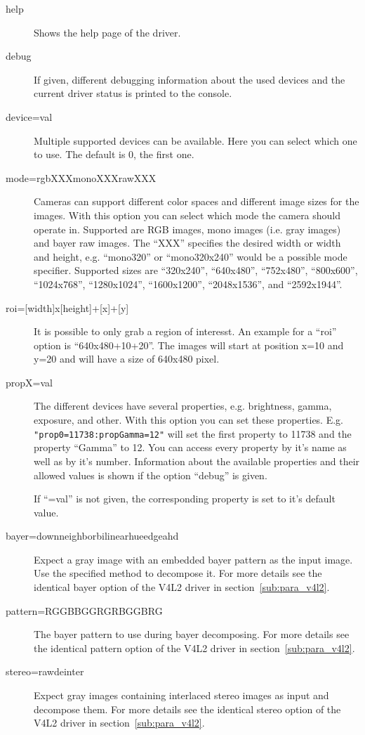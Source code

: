 \begin{description}
\item[help] Shows the help page of the driver.
\item[debug] If given, different debugging information about the
  used devices and the current driver status is printed to the
  console.
\item[device=val] Multiple supported devices can be available. Here
  you can select which one to use. The default is 0, the first one.
\item[mode=rgbXXX\textbar{}monoXXX\textbar{}rawXXX] Cameras can
  support different color spaces and different image sizes for the
  images. With this option you can select which mode the camera
  should operate in. Supported are RGB images, mono images
  (i.e. gray images) and bayer raw images. The ``XXX'' 
  specifies the desired width or width and height, e.g. ``mono320''
  or ``mono320x240'' would be a possible mode specifier. Supported
  sizes are ``320x240'', ``640x480'', ``752x480'', ``800x600'',
  ``1024x768'', ``1280x1024'', ``1600x1200'', ``2048x1536'', and
  ``2592x1944''.
\item[roi=[width{]}x[height{]}+[x{]}+[y{]}] It is possible to only
  grab a region of interesst. An example for a ``roi'' option is
  ``640x480+10+20''. The images will start at position x=10 and y=20
  and will have a size of 640x480 pixel.
\item[propX=val] The different devices have several properties,
  e.g. brightness, gamma, exposure, and other. With this option you
  can set these properties. E.g. \verb|"prop0=11738:propGamma=12"|
  will set the first property to 11738 and the property ``Gamma'' to
  12. You can access every property by it's name as well as by it's
  number. Information about the available properties and their
  allowed values is shown if the option ``debug'' is given.

  If ``=val'' is not given, the corresponding property is set to
  it's default value.
\item[bayer=down\textbar{}neighbor\textbar{}bilinear\textbar{}hue\textbar{}edge\textbar{}ahd]
  Expect a gray image with an embedded bayer pattern as the input
  image. Use the specified method to decompose it. For more details
  see the identical bayer option of the V4L2 driver in
  section~\ref{sub:para_v4l2}.
\item[pattern=RGGB\textbar{}BGGR\textbar{}GRBG\textbar{}GBRG]
  The bayer pattern to use during bayer decomposing. For more
  details see the identical pattern option of the V4L2 driver in
  section~\ref{sub:para_v4l2}.
\item[stereo=raw\textbar{}deinter] Expect gray images containing
  interlaced stereo images as input and decompose them. For more
  details see the identical stereo option of the V4L2 driver in
  section~\ref{sub:para_v4l2}.
\end{description}

